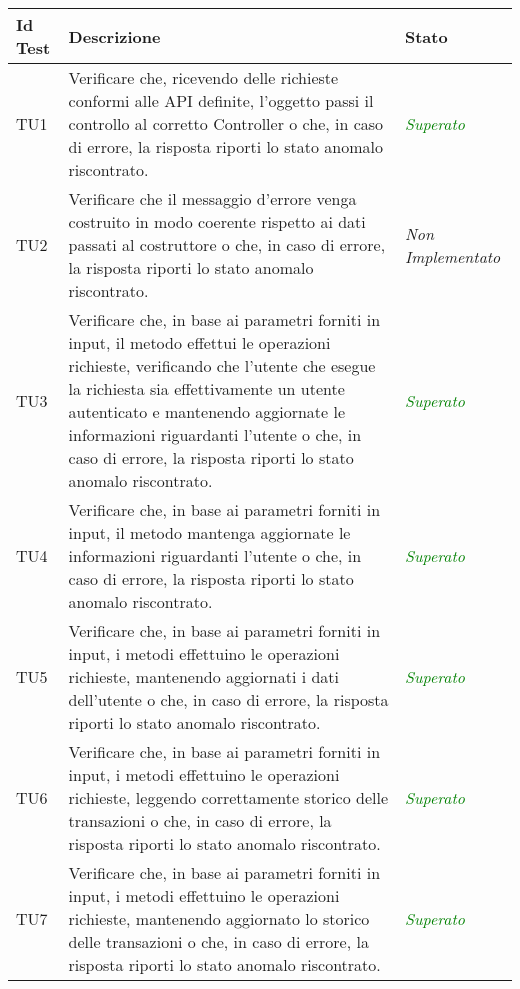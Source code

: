 	\normalsize
	\begin{longtable}{|>{\centering\arraybackslash}p{1.5cm}|>{\centering\arraybackslash}p{8cm} | >{\centering\arraybackslash}p{3.8cm}|}
		\hline \rowcolor{Gray}
		\textbf{Id Test} & \textbf{Descrizione} & \textbf{Stato}\\
		\hline
		\endhead
		\hypertarget{TU1}{TU1} & Verificare che, ricevendo delle richieste conformi alle API definite, l’oggetto passi il controllo al corretto Controller o che, in caso di errore, la risposta riporti lo stato anomalo riscontrato. & \textcolor{Green}{\textit{Superato}}\\ \hline
		\hypertarget{TU2}{TU2} & Verificare che il messaggio d’errore venga costruito in modo coerente rispetto ai dati passati al costruttore o che, in caso di errore, la risposta riporti lo stato anomalo riscontrato. & \textit{Non Implementato}\\ \hline
		\hypertarget{TU3}{TU3} & Verificare che, in base ai parametri forniti in input, il metodo effettui le operazioni richieste, verificando che l’utente che esegue la richiesta sia effettivamente un utente autenticato e mantenendo aggiornate le
		informazioni riguardanti l’utente
		o che, in caso di errore, la risposta riporti lo stato
		anomalo riscontrato. & \textcolor{Green}{\textit{Superato}}\\ \hline
		\hypertarget{TU4}{TU4} & Verificare che, in base ai parametri forniti in input, il metodo  mantenga aggiornate le informazioni riguardanti l’utente o che, in caso di errore, la risposta riporti lo stato anomalo riscontrato. & \textcolor{Green}{\textit{Superato}}\\ \hline
		\hypertarget{TU5}{TU5} & Verificare che, in base ai parametri forniti in input, i
		metodi effettuino le operazioni richieste, mantenendo
		aggiornati i dati dell'utente o che, in caso di
		errore, la risposta riporti lo stato anomalo riscontrato. & \textcolor{Green}{\textit{Superato}}\\ \hline
		\hypertarget{TU6}{TU6} & Verificare che, in base ai parametri forniti in input, i
		metodi effettuino le operazioni richieste, leggendo correttamente storico delle transazioni o che, in caso di errore, la risposta riporti lo stato anomalo riscontrato. & \textcolor{Green}{\textit{Superato}}\\ \hline
		\hypertarget{TU7}{TU7} & Verificare che, in base ai parametri forniti in input, i
		metodi effettuino le operazioni richieste, mantenendo
		aggiornato lo storico delle transazioni o che, in caso di errore, la risposta riporti lo stato anomalo riscontrato. & \textcolor{Green}{\textit{Superato}}\\ \hline

\end{longtable}
